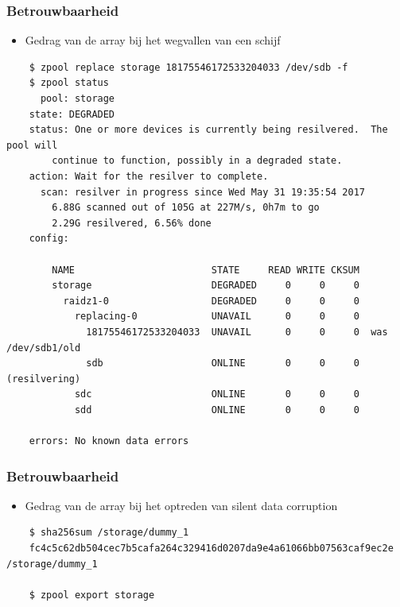 \documentclass{beamer}
\begin{document}
\begin{frame}[fragile]
  \frametitle{Betrouwbaarheid}
  \begin{itemize}
    \item Gedrag van de array bij het wegvallen van een schijf
  \end{itemize}
  \begin{verbatim}
    $ zpool replace storage 18175546172533204033 /dev/sdb -f
    $ zpool status 
      pool: storage
    state: DEGRADED
    status: One or more devices is currently being resilvered.  The pool will
	    continue to function, possibly in a degraded state.
    action: Wait for the resilver to complete.
      scan: resilver in progress since Wed May 31 19:35:54 2017
        6.88G scanned out of 105G at 227M/s, 0h7m to go
        2.29G resilvered, 6.56% done
    config:

	    NAME                        STATE     READ WRITE CKSUM
	    storage                     DEGRADED     0     0     0
	      raidz1-0                  DEGRADED     0     0     0
	        replacing-0             UNAVAIL      0     0     0
	          18175546172533204033  UNAVAIL      0     0     0  was /dev/sdb1/old
	          sdb                   ONLINE       0     0     0  (resilvering)
	        sdc                     ONLINE       0     0     0
	        sdd                     ONLINE       0     0     0

    errors: No known data errors
  \end{verbatim}
\end{frame}

\begin{frame}[fragile]
  \frametitle{Betrouwbaarheid}
  \begin{itemize}
    \item Gedrag van de array bij het optreden van silent data corruption
  \end{itemize}
  \begin{verbatim}
    $ sha256sum /storage/dummy_1 
    fc4c5c62db504cec7b5cafa264c329416d0207da9e4a61066bb07563caf9ec2e  /storage/dummy_1
    
    $ zpool export storage

  \end{verbatim}
\end{frame}
\end{document}
